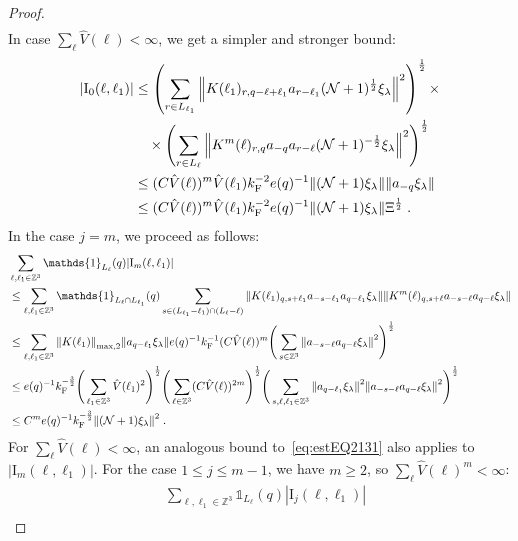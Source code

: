 \documentclass[12pt,a4paper]{article}
\numberwithin{equation}{section}
\newcommand{\1}{\mathbb{I}}
\newcommand{\F}{\mathrm{F}}
\newcommand{\I}{\mathrm{I}}
\newcommand{\kF}{k_\F}
\newcommand{\Zstar}{\mathbb{Z}^3} %
\newcommand{\Z}{\mathbb{Z}}
\newcommand{\NN}{\mathcal{N}}
\newcommand{\half}{\frac{1}{2}}
\theoremstyle{plain}
\theoremstyle{definition}
\theoremstyle{remark}
\theoremstyle{plain}
\theoremstyle{definition}
\theoremstyle{remark}
\begin{document}
\begin{proof}
\begin{align}
\end{align}
In case $ \sum_\ell \hat{V}(\ell) < \infty $, we get a simpler and stronger bound:
\begin{align}
	|\I_0(\ell, \ell_1)|
 	&\leq \left(\sum_{r\in L_{\ell_1}} \norm{ K(\ell_1)_{r,q-\ell+\ell_1} a_{r-\ell_1}(\NN+1)^{\half} \xi_\lambda}^2\right)^\half \times \nonumber\\
	& \quad \times \left(\sum_{r\in L_{\ell}} \norm{ K^m(\ell)_{r,q} a_{-q}a_{r-\ell} (\NN+1)^{-\half} \xi_\lambda }^2 \right)^\half \nonumber\\
	&\leq (C \hat{V}(\ell))^m \hat{V}(\ell_1) \kF^{-2} e(q)^{-1} \norm{ (\NN+1) \xi_\lambda} \norm{ a_{-q} \xi_\lambda } \nonumber \\
	&\leq (C \hat{V}(\ell))^m
		\hat{V}(\ell_1)
		\kF^{-2} e(q)^{-1}
		\norm{ (\NN+1) \xi_\lambda} \Xi^{\half} \;. \label{eq:estEQ2131}
\end{align}
In the case $ j = m $, we proceed as follows:
\begin{align}
	&\sum_{\ell,\ell_1 \in \Zstar} \mathds{1}_{L_\ell}(q) |\I_m(\ell, \ell_1)| \nonumber\\
	&\leq \sum_{\ell,\ell_1 \in \Zstar} \mathds{1}_{L_\ell \cap L_{\ell_1}}(q) \sum\limits_{s \in (L_{\ell_1} - \ell_1) \cap (L_\ell - \ell)}
		\norm{ K(\ell_1)_{q,s+\ell_1} a_{-s-\ell_1} a_{q-\ell_1} \xi_\lambda}
		\norm{ K^m(\ell)_{q,s+\ell} a_{-s-\ell} a_{q-\ell} \xi_\lambda } \nonumber\\
	&\leq \sum_{\ell,\ell_1 \in \Zstar}
		\norm{K(\ell_1)}_{\max,2}
		\norm{  a_{q-\ell_1} \xi_\lambda}
		e(q)^{-1} \kF^{-1} (C \hat{V}(\ell))^m
	\Bigg( \sum_{s\in \Z^3} \norm{a_{-s-\ell} a_{q-\ell} \xi_\lambda }^2 \Bigg)^{\half} \nonumber\\
	&\leq e(q)^{-1} \kF^{-\frac 32}
		\Bigg( \sum_{\ell_1 \in \Zstar} \hat{V}(\ell_1)^2 \Bigg)^{\half}
		\Bigg( \sum_{\ell \in \Zstar} (C \hat{V}(\ell))^{2m} \Bigg)^{\half}
		\Bigg( \sum_{s, \ell, \ell_1 \in \Z^3} \norm{ a_{q-\ell_1} \xi_\lambda}^2
		\norm{a_{-s-\ell} a_{q-\ell} \xi_\lambda }^2 \Bigg)^{\half} \nonumber\\
	&\leq C^m e(q)^{-1} \kF^{-\frac 32}
		\norm{(\NN+1) \xi_\lambda }^2
		\;. \label{eq:estEQ2131_Coulomb_bis}
\end{align}
For $ \sum_\ell \hat{V}(\ell) < \infty $, an analogous bound to~\eqref{eq:estEQ2131} also applies to $ |\I_m(\ell, \ell_1)| $. For the case $ 1 \le j \le m-1 $, we have $ m \ge 2 $, so $ \sum_\ell \hat{V}(\ell)^m < \infty $:
\begin{align}
	&\sum_{\ell,\ell_1 \in \Zstar} \mathds{1}_{L_\ell}(q) |\I_j(\ell, \ell_1)| \nonumber\\

\end{align}
\end{proof}
\end{document}
